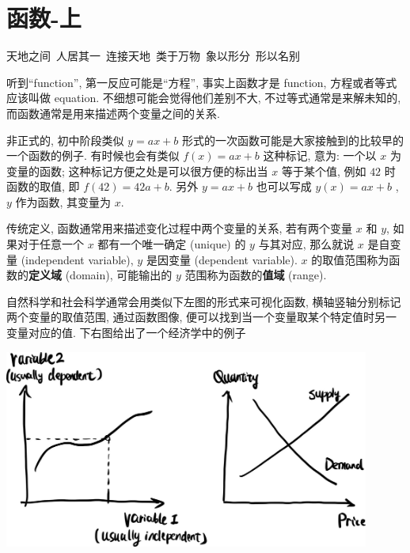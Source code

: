\section{函数-上}\label{003}

\begin{flushright}{\kaishu 天地之间\ 人居其一\ 连接天地\ 类于万物\ 象以形分\ 形以名别}\end{flushright}

\begin{tcolorbox}[size=fbox, breakable, enhanced jigsaw, title={函数 (function)}]

听到``function'', 第一反应可能是``方程'', 事实上函数才是 function,
方程或者等式应该叫做 equation. 不细想可能会觉得他们差别不大,
不过等式通常是来解未知的, 而函数通常是用来描述两个变量之间的关系.

非正式的, 初中阶段类似 $y=ax+b$
形式的一次函数可能是大家接触到的比较早的一个函数的例子. 有时候也会有类似
$f(x)=ax+b$ 这种标记, 意为: 一个以 $x$ 为变量的函数;
这种标记方便之处是可以很方便的标出当 $x$ 等于某个值, 例如 $42$
时函数的取值, 即 $f(42)=42a+b$. 另外 $y=ax+b$ 也可以写成
$y(x)=ax+b$ , $y$ 作为函数, 其变量为 $x$.

传统定义, 函数通常用来描述变化过程中两个变量的关系, 若有两个变量 $x$
和 $y$, 如果对于任意一个 $x$ 都有一个唯一确定 (unique) 的 $y$
与其对应, 那么就说 $x$ 是自变量 (independent variable), $y$ 是因变量
(dependent variable). $x$ 的取值范围称为函数的\textbf{定义域}
(domain), 可能输出的 $y$ 范围称为函数的\textbf{值域} (range).

自然科学和社会科学通常会用类似下左图的形式来可视化函数,
横轴竖轴分别标记两个变量的取值范围, 通过函数图像,
便可以找到当一个变量取某个特定值时另一变量对应的值.
下右图给出了一个经济学中的例子

\begin{tcolorbox}[size=fbox, breakable, enhanced jigsaw]
\includegraphics[width=0.9\textwidth]{img/image-20230228095149998.png}


\end{tcolorbox}
\end{tcolorbox}
